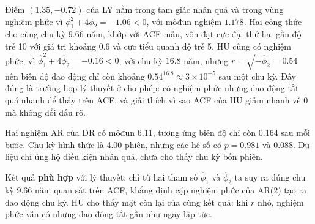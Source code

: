  Điểm $(1.35,-0.72)$ của LY nằm trong tam giác nhân quả và trong vùng nghiệm phức vì $\phi_1^2+4\phi_2=-1.06<0$, với môđun nghiệm $1.178$. Hai công thức cho cùng chu kỳ $9.66$ năm, khớp với ACF mẫu, vốn đạt cực đại thứ hai gần độ trễ 10 với giá trị khoảng $0.6$ và cực tiểu quanh độ trễ 5. HU cũng có nghiệm phức, vì $\hat\phi_1^2+4\hat\phi_2=-0.16<0$, với chu kỳ $16.8$ năm, nhưng $r=\sqrt{-\hat\phi_2}=0.54$ nên biên độ dao động chỉ còn khoảng $0.54^{16.8}\approx3\times10^{-5}$ sau một chu kỳ. Đây đúng là trường hợp lý thuyết ở  cho phép: có nghiệm phức nhưng dao động tắt quá nhanh để thấy trên ACF, và giải thích vì sao ACF của HU giảm nhanh về $0$ mà không đổi dấu rõ.

Hai nghiệm AR của DR có môđun 6.11, tương ứng biên độ chỉ còn 0.164 sau mỗi bước. Chu kỳ hình thức là 4.00 phiên, nhưng các hệ số có $p=0.981$ và $0.088$. Dữ liệu chỉ ủng hộ điều kiện nhân quả, chưa cho thấy chu kỳ bốn phiên.

 Kết quả \textbf{phù hợp} với lý thuyết: chỉ từ hai tham số $\hat\phi_1$ và $\hat\phi_2$ ta suy ra đúng chu kỳ $9.66$ năm quan sát trên ACF, khẳng định cặp nghiệm phức của AR(2) tạo ra dao động chu kỳ. HU cho thấy mặt còn lại của cùng kết quả: khi $r$ nhỏ, nghiệm phức vẫn có nhưng dao động tắt gần như ngay lập tức.

